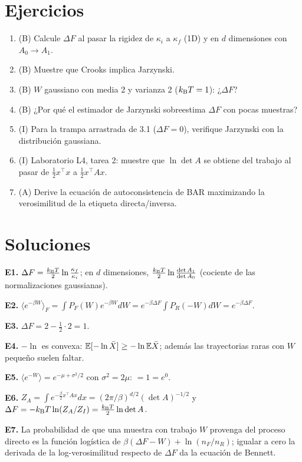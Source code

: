 \documentclass[11pt,a4paper]{article}
\begin{document}
\section{Ejercicios}
\begin{enumerate}[label=\textbf{E\arabic*.}]
\item (B) Calcule $\Delta F$ al pasar la rigidez de $\kappa_i$ a $\kappa_f$ (1D) y en $d$ dimensiones con $A_0\to A_1$.
\item (B) Muestre que Crooks implica Jarzynski.
\item (B) $W$ gaussiano con media 2 y varianza 2 ($k_{\mathrm B} T=1$): ¿$\Delta F$?
\item (B) ¿Por qué el estimador de Jarzynski sobreestima $\Delta F$ con pocas muestras?
\item (I) Para la trampa arrastrada de 3.1 ($\Delta F=0$), verifique Jarzynski con la distribución gaussiana.
\item (I) Laboratorio L4, tarea 2: muestre que $\ln\det A$ se obtiene del trabajo al pasar de $\frac12x^\top x$ a $\frac12x^\top Ax$.
\item (A) Derive la ecuación de autoconsistencia de BAR maximizando la verosimilitud de la etiqueta directa/inversa.
\end{enumerate}
\section{Soluciones}
\begin{solucion}
\textbf{E1.} $\Delta F=\frac{k_{\mathrm B} T}2\ln\frac{\kappa_f}{\kappa_i}$; en $d$ dimensiones, $\frac{k_{\mathrm B} T}2\ln\frac{\det A_1}{\det A_0}$ (cociente de las normalizaciones gaussianas).

\textbf{E2.} $\langle e^{-\beta W}\rangle_F=\int P_F(W)e^{-\beta W}dW=e^{-\beta\Delta F}\int P_R(-W)dW=e^{-\beta\Delta F}$.

\textbf{E3.} $\Delta F=2-\frac12\cdot2=1$.

\textbf{E4.} $-\ln$ es convexa: $\mathbb{E}[-\ln\bar X]\ge-\ln\mathbb{E}\bar X$; además las trayectorias raras con $W$ pequeño suelen faltar.

\textbf{E5.} $\langle e^{-W}\rangle=e^{-\mu+\sigma^2/2}$ con $\sigma^2=2\mu$: $=1=e^{0}$.

\textbf{E6.} $Z_A=\int e^{-\frac\beta2x^\top Ax}dx=(2\pi/\beta)^{d/2}(\det A)^{-1/2}$ y $\Delta F=-k_{\mathrm B} T\ln(Z_A/Z_I)=\frac{k_{\mathrm B} T}2\ln\det A$.

\textbf{E7.} La probabilidad de que una muestra con trabajo $W$ provenga del proceso directo es la función logística de $\beta(\Delta F-W)+\ln(n_F/n_R)$; igualar a cero la derivada de la log-verosimilitud respecto de $\Delta F$ da la ecuación de Bennett.
\end{solucion}
\end{document}
